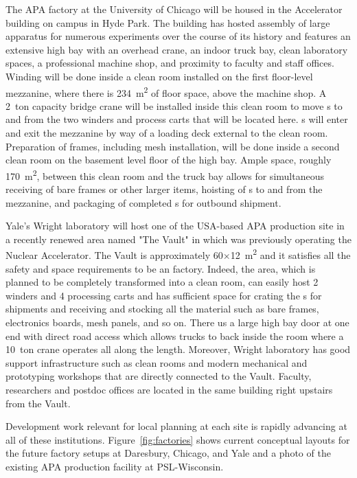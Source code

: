 The APA factory at the University of Chicago will be housed in the Accelerator building on campus in Hyde Park.  The building has hosted assembly of large apparatus for numerous experiments over the course of its history and features an extensive high bay with an overhead crane, an indoor truck bay, clean laboratory spaces, a professional machine shop, and proximity to faculty and staff offices.  Winding will be done inside a clean room installed on the first floor-level mezzanine, where there is \SI{234}{m^2} of floor space, above the machine shop.  A \SI{2}{ton} capacity bridge crane will be installed inside this clean room to move s to and from the two winders and process carts that will be located here.  s will enter and exit the mezzanine by way of a loading deck external to the clean room.  Preparation of  frames, including mesh installation, will be done inside a second clean room on the basement level floor of the high bay.  Ample space, roughly \SI{170}{m^2}, between this clean room and the truck bay allows for simultaneous receiving of bare frames or other larger items, hoisting of s to and from the mezzanine, and packaging of completed s for outbound shipment.

Yale's Wright laboratory will host one of the USA-based APA production site in a recently renewed area named "The Vault" in which was previously operating the Nuclear Accelerator.  The Vault is approximately 60$\times$\SI{12}{m^2} and it satisfies all the safety and space requirements to be an  factory. 
Indeed, the area, which is planned to be completely transformed into a clean room, can easily host 2 winders and 4 processing carts and has sufficient space for crating the s for shipments and receiving and stocking all the material such as bare frames, electronics boards, mesh panels, and so on. 
There us a large high bay door at one end with direct road access which allows trucks to back inside the room where a \SI{10}{ton} crane operates all along the length.  Moreover, Wright laboratory has good support infrastructure such as clean rooms and modern mechanical and prototyping workshops that are directly connected to the Vault. Faculty, researchers and postdoc offices are located in the same building right upstairs from the Vault.

Development work relevant for local planning at each site is rapidly advancing at all of these institutions.  Figure~\ref{fig:factories} shows current conceptual layouts for the future factory setups at Daresbury, Chicago, and Yale and a photo of the existing APA production facility at PSL-Wisconsin.    
 

